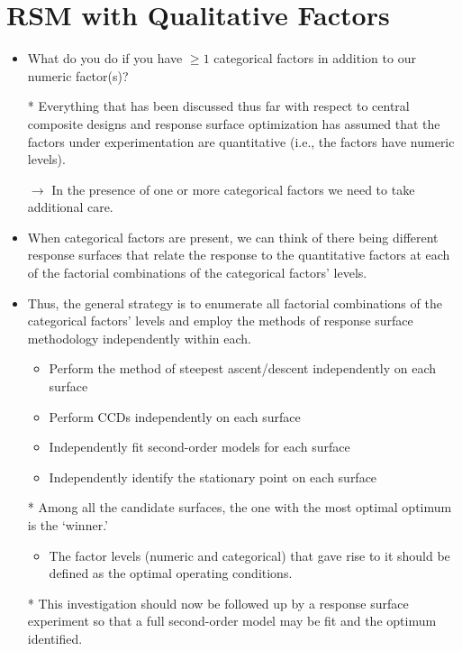 \section{RSM with Qualitative Factors}
\begin{itemize}
    \item What do you do if you have $ \ge 1 $ categorical factors in addition to our numeric factor(s)?
    \item[*] Everything that has been discussed thus far with respect to central composite designs and response
        surface optimization has assumed that the factors under experimentation are quantitative (i.e., the factors
        have numeric levels).
    \item[$\rightarrow$] In the presence of one or more categorical factors we need to take additional care.
    \item When categorical factors are present, we can think of there being different response surfaces that relate
          the response to the quantitative factors at each of the factorial combinations of the categorical factors'
          levels.
    \item Thus, the general strategy is to enumerate all factorial combinations of the categorical factors' levels
          and employ the methods of response surface methodology independently within each.
          \begin{itemize}
              \item Perform the method of steepest ascent/descent independently on each surface
              \item Perform CCDs independently on each surface
              \item Independently fit second-order models for each surface
              \item Independently identify the stationary point on each surface
          \end{itemize}
    \item[*] Among all the candidate surfaces, the one with the most optimal optimum is the `winner.'
        \begin{itemize}
            \item The factor levels (numeric and categorical) that gave rise to it should be defined as the optimal
                  operating conditions.
        \end{itemize}
    \item[*] This investigation should now be followed up by a response surface experiment so that a full second-order model may be fit and the optimum identified.

\end{itemize}

